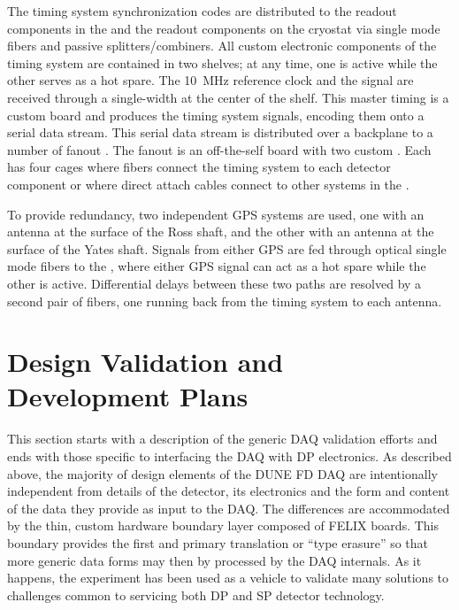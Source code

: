 The timing system synchronization codes are distributed to the 
readout components in the  and the readout components on the
cryostat via single mode fibers and passive splitters/combiners.
All custom electronic components of the timing system are contained in two
 shelves; at any time, one is active while the other serves as a hot
spare.
The \SI{10}{MHz} reference clock and the  signal are received through
a single-width  at the center of the  shelf.
This master timing  is a custom board and produces the timing system
signals, encoding them onto a serial data stream.
This serial data stream is distributed over a backplane to a number of fanout
.
The fanout  is an off-the-self board with two custom .
Each  has four  cages where fibers connect the timing
system to each detector component or where direct attach
cables connect to other systems in the .

To provide redundancy, two independent GPS systems are used, one with an antenna
at the surface of the Ross shaft, and the other with an antenna at the surface
of the Yates shaft.
Signals from either GPS are fed through optical single mode fibers to the
, where either GPS signal can act as a hot spare while the other is
active. 
Differential delays between these two paths are resolved by a second pair of
fibers, one running back from the timing system to each antenna.



\section{Design Validation and Development Plans}
\label{sec:daq:validation}


This section starts with a description of the generic DAQ validation
efforts and ends with those specific to interfacing the DAQ with DP
electronics. 
As described above, the majority of design elements of the DUNE FD DAQ
are intentionally independent from details of the detector, its
electronics and the form and content of the data they provide as input
to the DAQ. 
The differences are accommodated by the thin, custom hardware boundary
layer composed of FELIX boards. 
This boundary provides the first and primary translation or ``type
erasure'' so that more generic data forms may then by processed by the
DAQ internals.
As it happens, the  experiment has been used as a vehicle to
validate many solutions to challenges common to servicing both DP and SP
detector technology.

